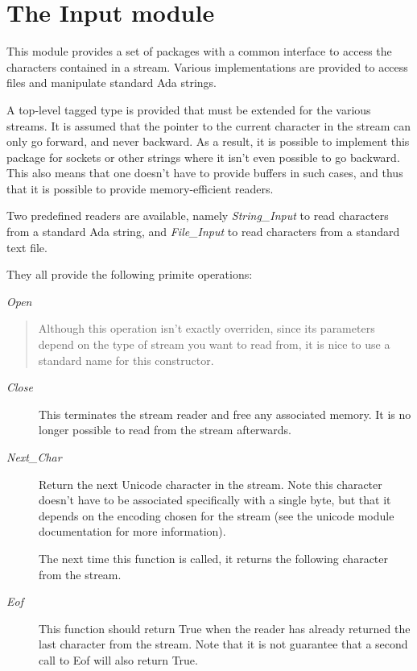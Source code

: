 \documentclass[letterpaper,10pt,english]{sphinxmanual}
\begin{document}
\chapter{The Input module}
\label{input:the-input-module}\label{input::doc}\label{input:id1}
This module provides a set of packages with a common interface to access the
characters contained in a stream. Various implementations are provided to
access files and manipulate standard Ada strings.

A top-level tagged type is provided that must be extended for the various
streams. It is assumed that the pointer to the current character in the stream
can only go forward, and never backward. As a result, it is possible to
implement this package for sockets or other strings where it isn't even
possible to go backward. This also means that one doesn't have to provide
buffers in such cases, and thus that it is possible to provide memory-efficient
readers.

Two predefined readers are available, namely \emph{String\_Input} to read characters
from a standard Ada string, and \emph{File\_Input} to read characters from a standard
text file.

They all provide the following primite operations:

\emph{Open}
\begin{quote}

Although this operation isn't exactly overriden, since its parameters
depend on the type of stream you want to read from, it is nice to
use a standard name for this constructor.
\end{quote}
\begin{description}
\item[{\emph{Close}}] \leavevmode
This terminates the stream reader and free any associated memory. It
is no longer possible to read from the stream afterwards.

\item[{\emph{Next\_Char}}] \leavevmode
Return the next Unicode character in the stream. Note this character doesn't
have to be associated specifically with a single byte, but that it depends on
the encoding chosen for the stream (see the unicode module documentation for
more information).

The next time this function is called, it returns the following character
from the stream.

\item[{\emph{Eof}}] \leavevmode
This function should return True when the reader has already returned the
last character from the stream. Note that it is not guarantee that a second
call to Eof will also return True.

\end{description}
\end{document}
